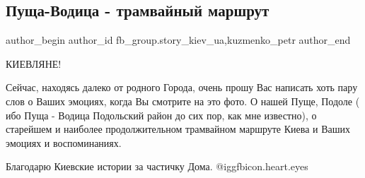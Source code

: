  
 
 
 
 
 
\subsection{Пуща-Водица - трамвайный маршрут}
\label{sec:18_02_2021.fb.fb_group.story_kiev_ua.2.puscha_vodica_tramvaj_marshrut}
 
\ifcmt
 author_begin
   author_id fb_group.story_kiev_ua,kuzmenko_petr
 author_end
\fi

\begin{multicols}{2} %
\setlength{\parindent}{0pt}
\Large\bfseries\em\color{blue}


КИЕВЛЯНЕ!
\vspace{1cm}

Сейчас, находясь далеко от родного Города, очень прошу Вас написать хоть пару
слов о Ваших эмоциях, когда Вы смотрите на это фото. О нашей Пуще, Подоле ( ибо
Пуща - Водица Подольский район до сих пор, как мне известно), о старейшем и
наиболее продолжительном трамвайном маршруте Киева и Ваших эмоциях и
воспоминаниях. 
\vspace{1cm}

Благодарю Киевские истории за частичку Дома. @igg{fbicon.heart.eyes} 

\end{multicols} %

